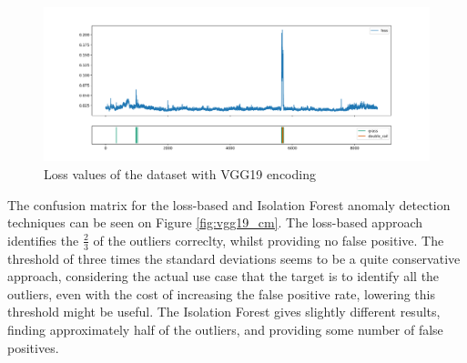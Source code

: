 \begin{figure}[!ht]
    \centering
    \includegraphics[width=\textwidth]{./results/vgg19_vgg19/20230510_172958_feature_vectors_loss.png}
    \caption{Loss values of the dataset with VGG19 encoding}
    \label{fig:vgg19_loss}
\end{figure}

The confusion matrix for the loss-based and Isolation Forest anomaly detection techniques can be seen
on Figure \ref{fig:vgg19_cm}.
The loss-based approach identifies the $\frac{2}{3}$ of the outliers correclty,
whilst providing no false positive.
The threshold of three times the standard deviations seems to be a quite conservative approach,
considering the actual use case that the target is to identify all the outliers, even with the cost
of increasing the false positive rate, lowering this threshold might be useful.
The Isolation Forest gives slightly different results, finding approximately half of the outliers,
and providing some number of false positives.

